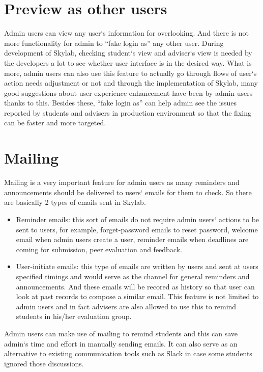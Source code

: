 \section{Preview as other users} \label{adminpreviewas}

Admin users can view any user`s information for overlooking. And there is not more functionality for admin to ``fake login as'' any other user. During development of Skylab, checking student`s view and adviser`s view is needed by the developers a lot to see whether user interface is in the desired way. What is more, admin users can also use this feature to actually go through flows of user`s action needs adjustment or not and through the implementation of Skylab, many good suggestions about user experience enhancement have been by admin users thanks to this. Besides these, ``fake login as'' can help admin see the issues reported by students and advisers in production environment so that the fixing can be faster and more targeted.  

\section{Mailing} \label{adminmailing}

Mailing is a very important feature for admin users as many reminders and announcements should be delivered to users` emails for them to check. So there are basically 2 types of emails sent in Skylab.

\begin{itemize}
  \item Reminder emails: this sort of emails do not require admin users` actions to be sent to users, for example, forget-password emails to reset password, welcome email when admin users create a user, reminder emails when deadlines are coming for submission, peer evaluation and feedback.
  \item User-initiate emails: this type of emails are written by users and sent at users specified timings and would serve as the channel for general reminders and announcements. And these emails will be recored as history so that user can look at past records to compose a similar email. This feature is not limited to admin users and in fact advisers are also allowed to use this to remind students in his/her evaluation group.
\end{itemize}

Admin users can make use of mailing to remind students and this can save admin`s time and effort in manually sending emails. It can also serve as an alternative to existing communication tools such as Slack in case some students ignored those discussions.
